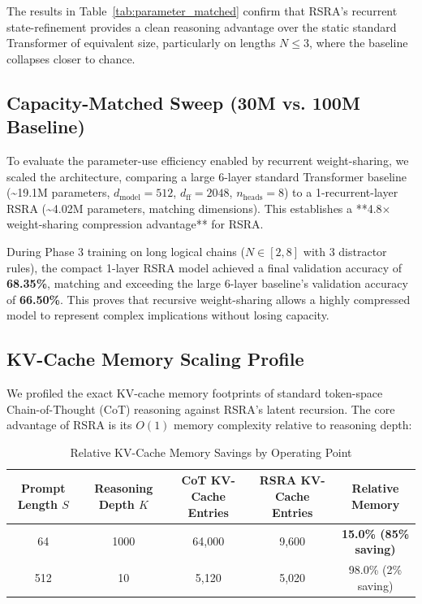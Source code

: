 \documentclass[11pt,a4paper]{article}
\theoremstyle{definition}
\begin{document}
The results in Table~\ref{tab:parameter_matched} confirm that RSRA's recurrent state-refinement provides a clean reasoning advantage over the static standard Transformer of equivalent size, particularly on lengths $N \le 3$, where the baseline collapses closer to chance.

\subsection{Capacity-Matched Sweep (30M vs. 100M Baseline)}

To evaluate the parameter-use efficiency enabled by recurrent weight-sharing, we scaled the architecture, comparing a large 6-layer standard Transformer baseline (\textasciitilde 19.1M parameters, $d_{\text{model}}=512$, $d_{\text{ff}}=2048$, $n_{\text{heads}}=8$) to a 1-recurrent-layer RSRA (\textasciitilde 4.02M parameters, matching dimensions). This establishes a **4.8$\times$ weight-sharing compression advantage** for RSRA.

During Phase 3 training on long logical chains ($N \in [2, 8]$ with 3 distractor rules), the compact 1-layer RSRA model achieved a final validation accuracy of \textbf{68.35\%}, matching and exceeding the large 6-layer baseline's validation accuracy of \textbf{66.50\%}. This proves that recursive weight-sharing allows a highly compressed model to represent complex implications without losing capacity.

\subsection{KV-Cache Memory Scaling Profile}

We profiled the exact KV-cache memory footprints of standard token-space Chain-of-Thought (CoT) reasoning against RSRA's latent recursion. The core advantage of RSRA is its $O(1)$ memory complexity relative to reasoning depth:

\begin{table}[h]
\centering
\caption{Relative KV-Cache Memory Savings by Operating Point}
\label{tab:kv_cache}
\begin{tabular}{ccccc}
\toprule
Prompt Length $S$ & Reasoning Depth $K$ & CoT KV-Cache Entries & RSRA KV-Cache Entries & Relative Memory \\
\midrule
64 & 1000 & 64,000 & 9,600 & \textbf{15.0\% (85\% saving)} \\
512 & 10 & 5,120 & 5,020 & 98.0\% (2\% saving) \\
\bottomrule
\end{tabular}
\end{table}
\end{document}
